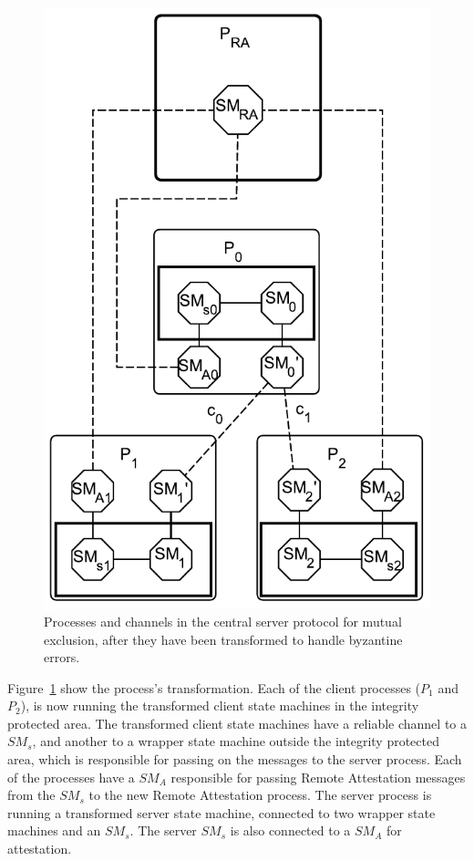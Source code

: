 \documentclass{article}
\begin{document}
		\FloatBarrier
		\begin{figure}[ht!]
			\center
			\includegraphics[scale=0.6]{figures/state-machines/CSME-protocol-transformed.pdf}
			\caption{Processes and channels in the central server protocol for mutual exclusion, after they have been transformed to handle byzantine errors.}
			\label{fig:CSME-protocol-transformed}
		\end{figure}
		\FloatBarrier

		Figure~\ref{fig:CSME-protocol-transformed} show the process's transformation.
		Each of the client processes ($P_1$ and $P_2$), is now running the transformed client state machines in the integrity protected area.
		The transformed client state machines have a reliable channel to a $SM_s$, and another to a wrapper state machine outside the integrity protected area, which is responsible for passing on the messages to the server process.
		Each of the processes have a $SM_A$ responsible for passing Remote Attestation messages from the $SM_s$ to the new Remote Attestation process.
		The server process is running a transformed server state machine, connected to two wrapper state machines and an $SM_s$.
		The server $SM_s$ is also connected to a $SM_A$ for attestation.
\end{document}
